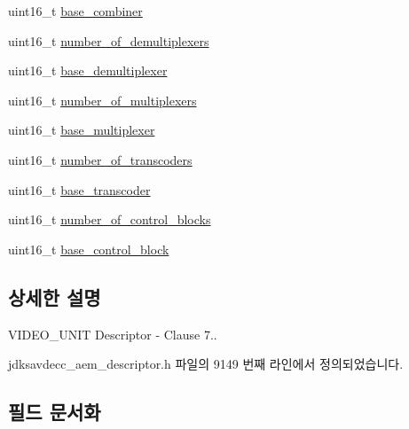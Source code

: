 \begin{DoxyCompactItemize}
\item 
uint16\+\_\+t \hyperlink{structjdksavdecc__descriptor__video__unit_afeae9980c36b3e99f2e4b8ab2c31e9d5}{base\+\_\+combiner}
\item 
uint16\+\_\+t \hyperlink{structjdksavdecc__descriptor__video__unit_ae2ee0d16f100be7e14722eaffcc600b4}{number\+\_\+of\+\_\+demultiplexers}
\item 
uint16\+\_\+t \hyperlink{structjdksavdecc__descriptor__video__unit_a36901b5833f03ae7be92b52745b3054c}{base\+\_\+demultiplexer}
\item 
uint16\+\_\+t \hyperlink{structjdksavdecc__descriptor__video__unit_aa2bffcf80dd2b162cce9a335ef515165}{number\+\_\+of\+\_\+multiplexers}
\item 
uint16\+\_\+t \hyperlink{structjdksavdecc__descriptor__video__unit_a3e13f295f26afe3335587c18790c7dda}{base\+\_\+multiplexer}
\item 
uint16\+\_\+t \hyperlink{structjdksavdecc__descriptor__video__unit_ad9030c572f8891febbc6108f96772835}{number\+\_\+of\+\_\+transcoders}
\item 
uint16\+\_\+t \hyperlink{structjdksavdecc__descriptor__video__unit_ac7e02a98f43dc72d6384a6635fbaf944}{base\+\_\+transcoder}
\item 
uint16\+\_\+t \hyperlink{structjdksavdecc__descriptor__video__unit_a564f961a8cec6e8f7b4bfdbbbfe650d4}{number\+\_\+of\+\_\+control\+\_\+blocks}
\item 
uint16\+\_\+t \hyperlink{structjdksavdecc__descriptor__video__unit_a9303491ec92ba42c28fb904c14d310b0}{base\+\_\+control\+\_\+block}
\end{DoxyCompactItemize}


\subsection{상세한 설명}
V\+I\+D\+E\+O\+\_\+\+U\+N\+IT Descriptor -\/ Clause 7.. 

jdksavdecc\+\_\+aem\+\_\+descriptor.\+h 파일의 9149 번째 라인에서 정의되었습니다.



\subsection{필드 문서화}
